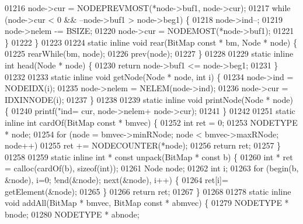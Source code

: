 \begin{DoxyCode}
01216         node->cur = NODEPREVMOST(*node->buf1, node->cur);
01217         \textcolor{keywordflow}{while} (node->cur < 0 && --node->buf1 > node->beg1) \{
01218                 node->ind--;
01219                 node->nelem -= BSIZE;
01220                 node->cur = NODEMOST(*node->buf1);
01221         \}
01222 \}
01223 
01224 \textcolor{keyword}{static} \textcolor{keyword}{inline} \textcolor{keywordtype}{void} rear(BitMap \textcolor{keyword}{const} * bm, Node * node) \{
01225         rearWhile(bm, node);
01226         prev(node);
01227 \}
01228 
01229 \textcolor{keyword}{static} \textcolor{keyword}{inline} \textcolor{keywordtype}{int} head(Node * node) \{
01230         \textcolor{keywordflow}{return} node->buf1 <= node->beg1;
01231 \}
01232 
01233 \textcolor{keyword}{static} \textcolor{keyword}{inline} \textcolor{keywordtype}{void} getNode(Node * node, \textcolor{keywordtype}{int} i) \{
01234         node->ind = NODEIDX(i);
01235         node->nelem = NELEM(node->ind);
01236         node->cur = IDXINNODE(i);
01237 \}
01238 
01239 \textcolor{keyword}{static} \textcolor{keyword}{inline} \textcolor{keywordtype}{void} printNode(Node * node) \{
01240         printf(\textcolor{stringliteral}{"ind=%
      cur, node->nelem+ node->cur);
01241 \}
01242 
01251 \textcolor{keyword}{static} \textcolor{keyword}{inline} \textcolor{keywordtype}{int} cardOf(BitMap \textcolor{keyword}{const} * bmvec) \{
01252         \textcolor{keywordtype}{int} ret = 0;
01253         NODETYPE * node;
01254         \textcolor{keywordflow}{for} (node = bmvec->minRNode; node < bmvec->maxRNode; node++)
01255                 ret += NODECOUNTER(*node);
01256         \textcolor{keywordflow}{return} ret;
01257 \}
01258 
01259 \textcolor{keyword}{static} \textcolor{keyword}{inline} \textcolor{keywordtype}{int} * \textcolor{keyword}{const} unpack(BitMap * \textcolor{keyword}{const} b) \{
01260         \textcolor{keywordtype}{int} * ret = calloc(cardOf(b), \textcolor{keyword}{sizeof}(\textcolor{keywordtype}{int}));
01261         Node node;
01262         \textcolor{keywordtype}{int} i;
01263         \textcolor{keywordflow}{for} (begin(b, &node), i=0; !end(&node); next(&node), i++) \{
01264                 ret[i]= getElement(&node);
01265         \}
01266         \textcolor{keywordflow}{return} ret;
01267 \}
01268 
01278 \textcolor{keyword}{static} \textcolor{keyword}{inline} \textcolor{keywordtype}{void} addAll(BitMap * bmvec, BitMap \textcolor{keyword}{const} * abmvec) \{
01279         NODETYPE * bnode;
01280         NODETYPE * abnode;
}
\end{DoxyCode}
